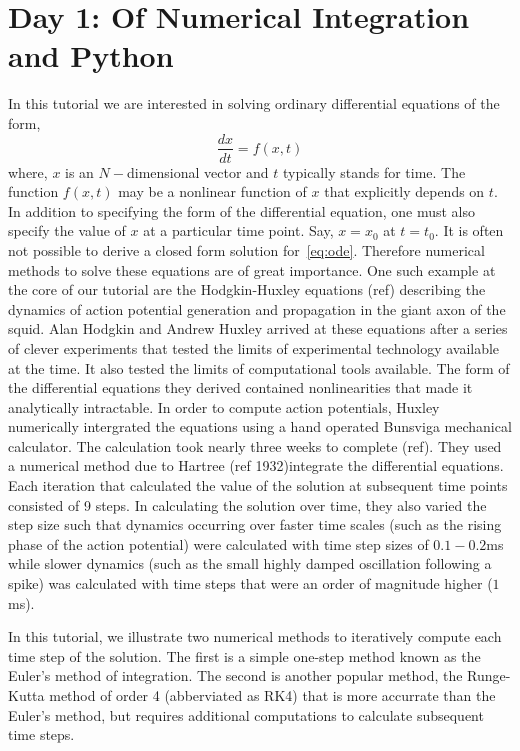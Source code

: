 \documentclass[10pt,letterpaper]{article}
\begin{document}
\section*{Day 1: Of Numerical Integration and Python}
In this tutorial we are interested in solving ordinary differential equations of the form,
\begin{equation}
\frac{dx}{dt} = f(x, t)
\label{eq:ode}
\end{equation}
where, $x$ is an $N-$dimensional vector and $t$ typically stands for time. The function $f(x,t)$ may be a nonlinear function of $x$ that explicitly depends on $t$. In addition to specifying the form of the differential equation, one must also specify the value of $x$ at a particular time point. Say, $x=x_{0}$ at $t = t_0$. It is often not possible to derive a closed form solution for~\ref{eq:ode}. Therefore numerical methods to solve these equations are of great importance. One such example at the core of our tutorial are the Hodgkin-Huxley equations (ref) describing the dynamics of action potential generation and propagation in the giant axon of the squid. Alan Hodgkin and Andrew Huxley arrived at these equations after a series of clever experiments that tested the limits of experimental technology available at the time. It also tested the limits of computational tools available. The form of the differential equations they derived contained nonlinearities that made it analytically intractable. In order to compute action potentials, Huxley numerically intergrated the equations using a hand operated Bunsviga mechanical calculator. The calculation took nearly three weeks to complete (ref). They used a numerical method due to Hartree (ref 1932)integrate the differential equations. Each iteration that calculated the value of the solution at subsequent time points consisted of 9 steps. In calculating the solution over time, they also varied the step size such that dynamics occurring over faster time scales (such as the rising phase of the action potential) were calculated with time step sizes of $0.1-0.2$ms while slower dynamics (such as the small highly damped oscillation following a spike) was calculated with time steps that were an order of magnitude higher ($1$ms).

In this tutorial, we illustrate two numerical methods to iteratively compute each time step of the solution. The first is a simple one-step method known as the Euler's method of integration. The second is another popular method, the Runge-Kutta method of order 4 (abberviated as RK4) that is more accurrate than the Euler's method, but requires additional computations to calculate subsequent time steps. 
\end{document}
